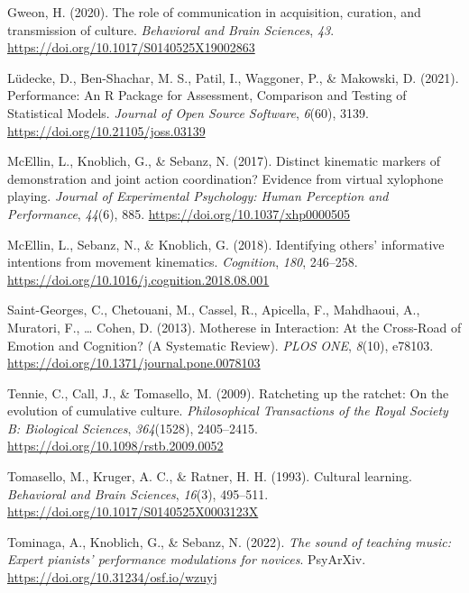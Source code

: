 \documentclass[
  man,floatsintext]{apa6}
\newlength{\cslhangindent}
\newlength{\cslentryspacingunit} %
\newenvironment{CSLReferences}[2] %
 {%
  \setlength{\parindent}{0pt}
  \ifodd #1
  \let\oldpar\par
  \def\par{\hangindent=\cslhangindent\oldpar}
  \fi
  \setlength{\parskip}{#2\cslentryspacingunit}
 }%
 {}
\begin{document}
\begin{CSLReferences}{1}{0}
\leavevmode{}%
Gweon, H. (2020). The role of communication in acquisition, curation, and transmission of culture. \emph{Behavioral and Brain Sciences}, \emph{43}. \url{https://doi.org/10.1017/S0140525X19002863}

\leavevmode{}%
Lüdecke, D., Ben-Shachar, M. S., Patil, I., Waggoner, P., \& Makowski, D. (2021). Performance: {An R Package} for {Assessment}, {Comparison} and {Testing} of {Statistical Models}. \emph{Journal of Open Source Software}, \emph{6}(60), 3139. \url{https://doi.org/10.21105/joss.03139}

\leavevmode{}%
McEllin, L., Knoblich, G., \& Sebanz, N. (2017). Distinct kinematic markers of demonstration and joint action coordination? {Evidence} from virtual xylophone playing. \emph{Journal of Experimental Psychology: Human Perception and Performance}, \emph{44}(6), 885. \url{https://doi.org/10.1037/xhp0000505}

\leavevmode{}%
McEllin, L., Sebanz, N., \& Knoblich, G. (2018). Identifying others' informative intentions from movement kinematics. \emph{Cognition}, \emph{180}, 246--258. \url{https://doi.org/10.1016/j.cognition.2018.08.001}

\leavevmode{}%
Saint-Georges, C., Chetouani, M., Cassel, R., Apicella, F., Mahdhaoui, A., Muratori, F., \ldots{} Cohen, D. (2013). Motherese in {Interaction}: {At} the {Cross-Road} of {Emotion} and {Cognition}? ({A Systematic Review}). \emph{PLOS ONE}, \emph{8}(10), e78103. \url{https://doi.org/10.1371/journal.pone.0078103}

\leavevmode{}%
Tennie, C., Call, J., \& Tomasello, M. (2009). Ratcheting up the ratchet: On the evolution of cumulative culture. \emph{Philosophical Transactions of the Royal Society B: Biological Sciences}, \emph{364}(1528), 2405--2415. \url{https://doi.org/10.1098/rstb.2009.0052}

\leavevmode{}%
Tomasello, M., Kruger, A. C., \& Ratner, H. H. (1993). Cultural learning. \emph{Behavioral and Brain Sciences}, \emph{16}(3), 495--511. \url{https://doi.org/10.1017/S0140525X0003123X}

\leavevmode{}%
Tominaga, A., Knoblich, G., \& Sebanz, N. (2022). \emph{The sound of teaching music: {Expert} pianists' performance modulations for novices}. {PsyArXiv}. \url{https://doi.org/10.31234/osf.io/wzuyj}


\end{CSLReferences}
\end{document}
